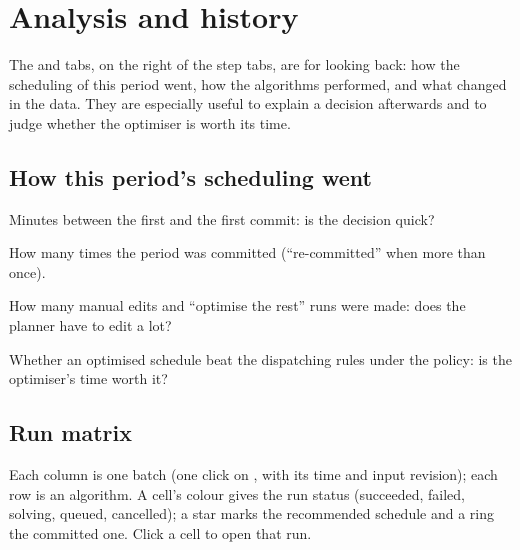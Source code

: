 \chapter{Analysis and history}\label{ch:analysis}

The  and  tabs, on the right of the step tabs, are for looking back: how the
scheduling of this period went, how the algorithms performed, and what changed in the data. They are
especially useful to explain a decision afterwards and to judge whether the optimiser is worth its time.

\section{How this period's scheduling went}


\begin{description}[style=nextline, leftmargin=1.2em, font=\bfseries\color{brand}]
  \item[First generation to commit] Minutes between the first  and the first commit: is
        the decision quick?
  \item[Commits] How many times the period was committed (``re-committed'' when more than once).
  \item[Hand edits / re-optimisations] How many manual edits and ``optimise the rest'' runs were made: does
        the planner have to edit a lot?
  \item[Optimiser beat the rules?] Whether an optimised schedule beat the dispatching rules under the policy:
        is the optimiser's time worth it?
\end{description}

\section{Run matrix}


Each column is one batch (one click on , with its time and input revision); each row is an
algorithm. A cell's colour gives the run status (succeeded, failed, solving, queued, cancelled); a star marks
the recommended schedule and a ring the committed one. Click a cell to open that run.

